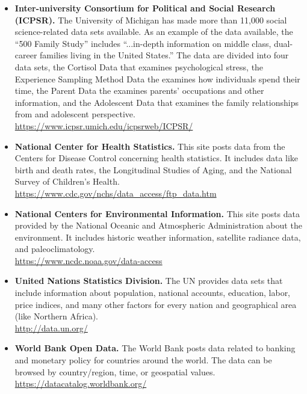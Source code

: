 \begin{itemize}
	\item \textbf{Inter-university Consortium for Political and Social Research (ICPSR).} The University of Michigan has made more than 11,000 social science-related data sets available. As an example of the data available, the ``500 Family Study'' includes ``...in-depth information on middle class, dual-career families living in the United States.'' The data are divided into four data sets, the Cortisol Data that examines psychological stress, the Experience Sampling Method Data the examines how individuals spend their time, the Parent Data the examines parents' occupations and other information, and the Adolescent Data that examines the family relationships from and adolescent perspective.
	\\ \url{https://www.icpsr.umich.edu/icpsrweb/ICPSR/}

	\item \textbf{National Center for Health Statistics.} This site posts data from the Centers for Disease Control concerning health statistics. It includes data like birth and death rates, the Longitudinal Studies of Aging, and the National Survey of Children's Health.
	\\ \url{https://www.cdc.gov/nchs/data_access/ftp_data.htm}

	\item \textbf{National Centers for Environmental Information.} This site posts data provided by the National Oceanic and Atmospheric Administration about the environment. It includes historic weather information, satellite radiance data, and paleoclimatology.
	\\ \url{https://www.ncdc.noaa.gov/data-access}

	\item \textbf{United Nations Statistics Division.} The UN provides data sets that include information about population, national accounts, education, labor, price indices, and many other factors for every nation and geographical area (like Northern Africa). 
	\\ \url{http://data.un.org/}

	\item \textbf{World Bank Open Data.} The World Bank posts data related to banking and monetary policy for countries around the world. The data can be browsed by country/region, time, or geospatial values.
	\\ \url{https://datacatalog.worldbank.org/}
	
\end{itemize}

